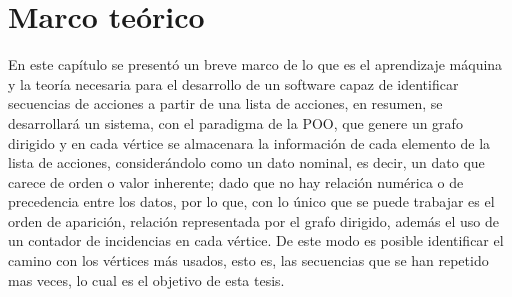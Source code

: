 
\chapter{Marco te\'orico}
\label{sec:chapter3}






\newpage




En este cap\'itulo se present\'o un breve marco de lo que es el aprendizaje
 m\'aquina y la teor\'ia necesaria para el desarrollo de un software capaz de 
 identificar secuencias de acciones a partir de una lista de acciones, en 
 resumen, se desarrollar\'a un sistema, con el paradigma de la POO, que genere 
 un grafo dirigido y en cada v\'ertice se almacenara la informaci\'on de cada 
 elemento de la lista de acciones, consider\'andolo como un dato nominal, es 
 decir, un dato que carece de orden o valor inherente; dado que no hay
 relaci\'on num\'erica o de precedencia entre los datos, por lo que, con lo 
 \'unico que se puede trabajar es el orden de aparici\'on, relaci\'on 
 representada por el grafo dirigido, adem\'as el uso de un contador de 
 incidencias en cada v\'ertice. De este modo es posible identificar el camino 
 con los v\'ertices m\'as usados, esto es, las secuencias que se han repetido 
 mas veces, lo cual es el objetivo de esta tesis.
